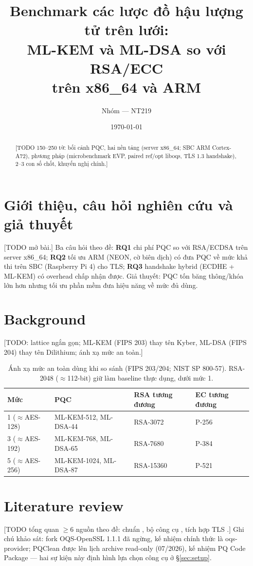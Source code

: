 \documentclass[11pt,a4paper]{article}
\title{\textbf{Benchmark các lược đồ hậu lượng tử trên lưới:\\ML-KEM và ML-DSA so với RSA/ECC\\trên x86\_64 và ARM}}
\author{Nhóm --- NT219}
\date{\today}
\begin{document}
\maketitle

\begin{abstract}
[TODO 150--250 từ: bối cảnh PQC, hai nền tảng (server x86\_64; SBC ARM Cortex-A72), phương pháp (microbenchmark EVP, paired ref/opt liboqs, TLS 1.3 handshake), 2--3 con số chốt, khuyến nghị chính.]
\end{abstract}

\tableofcontents

\section{Giới thiệu, câu hỏi nghiên cứu và giả thuyết}
[TODO mở bài.] Ba câu hỏi theo đề: \textbf{RQ1} chi phí PQC so với RSA/ECDSA trên server x86\_64; \textbf{RQ2} tối ưu ARM (NEON, cờ biên dịch) có đưa PQC về mức khả thi trên SBC (Raspberry Pi 4) cho TLS; \textbf{RQ3} handshake hybrid (ECDHE + ML-KEM) có overhead chấp nhận được. Giả thuyết: PQC tốn băng thông/khóa lớn hơn nhưng tối ưu phần mềm đưa hiệu năng về mức đủ dùng.

\section{Background}
[TODO: lattice ngắn gọn; ML-KEM (FIPS 203) thay tên Kyber, ML-DSA (FIPS 204) thay tên Dilithium; ánh xạ mức an toàn.]

\begin{table}[h]\centering
\caption{Ánh xạ mức an toàn dùng khi so sánh (FIPS 203/204; NIST SP 800-57). RSA-2048 ($\approx$112-bit) giữ làm baseline thực dụng, dưới mức 1.}
\begin{tabular}{llll}\toprule
Mức & PQC & RSA tương đương & EC tương đương\\\midrule
1 ($\approx$AES-128) & ML-KEM-512, ML-DSA-44 & RSA-3072 & P-256\\
3 ($\approx$AES-192) & ML-KEM-768, ML-DSA-65 & RSA-7680 & P-384\\
5 ($\approx$AES-256) & ML-KEM-1024, ML-DSA-87 & RSA-15360 & P-521\\\bottomrule
\end{tabular}
\end{table}

\section{Literature review}
[TODO tổng quan $\geq$6 nguồn theo đề: chuẩn \cite{fips203,fips204,sp80057}, bộ công cụ \cite{liboqs,pqclean,oqsprovider,pqm4}, tích hợp TLS \cite{openssl35}.] Ghi chú khảo sát: fork OQS-OpenSSL 1.1.1 đã ngừng, kế nhiệm chính thức là oqs-provider; PQClean được lên lịch archive read-only (07/2026), kế nhiệm PQ Code Package --- hai sự kiện này định hình lựa chọn công cụ ở \S\ref{sec:setup}.
\end{document}
